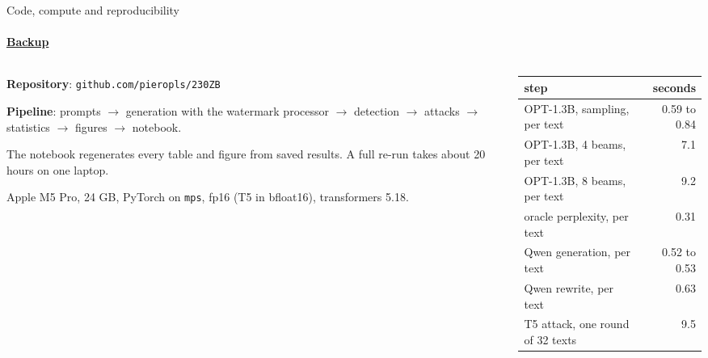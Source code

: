 \documentclass[aspectratio=169,10pt,t]{beamer}
\newcommand{\key}[1]{\textcolor{calblue}{\textbf{#1}}}
\newcommand{\quiet}[1]{\textcolor{muted}{#1}}
\begin{document}
\begin{frame}[label=b21]{Code, compute and reproducibility}
  \framesubtitle{\hyperlink{b0}{Backup}}
  \begin{columns}[T,onlytextwidth]
    \begin{column}{0.52\textwidth}
      \setlength{\parskip}{0.5em}
      \key{Repository}: \texttt{github.com/pieropls/230ZB}

      \key{Pipeline}: prompts $\to$ generation with the watermark processor $\to$ detection $\to$ attacks $\to$ statistics $\to$ figures $\to$ notebook.

      The notebook regenerates every table and figure from saved results. A full re-run takes about 20 hours on one laptop.

      \quiet{\small Apple M5 Pro, 24 GB, PyTorch on \texttt{mps}, fp16 (T5 in bfloat16), transformers 5.18.}
    \end{column}
    \begin{column}{0.44\textwidth}
      {\small
      \begin{tabular}{@{}lr@{}}
        \toprule
        step & seconds \\
        \midrule
        OPT-1.3B, sampling, per text & 0.59 to 0.84 \\
        OPT-1.3B, 4 beams, per text & 7.1 \\
        OPT-1.3B, 8 beams, per text & 9.2 \\
        oracle perplexity, per text & 0.31 \\
        Qwen generation, per text & 0.52 to 0.53 \\
        Qwen rewrite, per text & 0.63 \\
        T5 attack, one round of 32 texts & 9.5 \\
        \bottomrule
      \end{tabular}}
    \end{column}
  \end{columns}
\end{frame}
\end{document}

